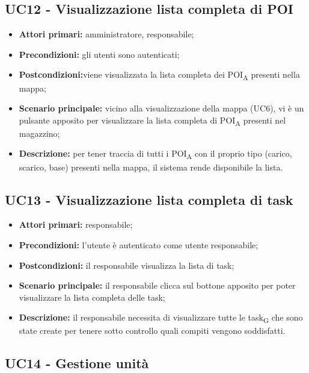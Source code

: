 \subsection{UC12 - Visualizzazione lista completa di POI}
\begin{itemize}
	\item 	\textbf{Attori primari:} amministratore, responsabile;
	\item 	\textbf{Precondizioni:} gli utenti sono autenticati;
	\item 	\textbf{Postcondizioni:}viene visualizzata la lista completa dei \acrshort{POI}\textsubscript{A} presenti nella mappa;
	\item 	\textbf{Scenario principale:} vicino alla visualizzazione della mappa (UC6), vi è un pulsante apposito per visualizzare la lista completa di \acrshort{POI}\textsubscript{A} presenti nel magazzino;
	\item 	\textbf{Descrizione:} per tener traccia di tutti i \acrshort{POI}\textsubscript{A} con il proprio tipo (carico, scarico, base) presenti nella mappa, il sistema rende disponibile la lista.

\end{itemize}

\subsection{UC13 - Visualizzazione lista completa di task}
\begin{itemize}
	\item 	\textbf{Attori primari:} responsabile;
	\item 	\textbf{Precondizioni:} l’utente è autenticato come utente responsabile;
	\item 	\textbf{Postcondizioni:} il responsabile visualizza la lista di task;
	\item 	\textbf{Scenario principale:} il responsabile clicca sul bottone apposito per poter visualizzare la lista completa delle task;
	\item 	\textbf{Descrizione:} il responsabile necessita di visualizzare tutte le \gls{task}\textsubscript{G} che sono state create per tenere sotto controllo quali compiti vengono soddisfatti.

\end{itemize}

\subsection{UC14 - Gestione unità}

